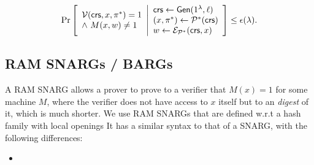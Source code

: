 \begin{definition} 
\begin{itemize}
\begin{gather*}
        \underset{}{\text{Pr}}\left [
        \begin{array}{ll}
        \mathcal{V}(\mathit{ \mathsf{crs} }, x, \pi^*) = 1 \\
        \wedge\ M(x,w)\neq 1
        \end{array}
        \middle\vert
        \begin{array}{ll}
        \mathit{ \mathsf{crs} } \leftarrow \mathsf{Gen}(1^\lambda, \ell) \\
        (x, \pi^*) \leftarrow \mathcal{P}^*(\mathit{ \mathsf{crs} }) \\
        w\leftarrow \mathcal{E}_{\mathcal{P}^*}(\mathit{ \mathsf{crs} }, x)
        \end{array}
        \right ] \leq \epsilon(\lambda)
	.
    \end{gather*}
\end{itemize}
\end{definition}


\subsection{RAM SNARGs / BARGs}
A RAM SNARG allows a  prover to prove to a verifier that $M(x) = 1$ for some machine $M$, where the verifier does not have access to $x$ itself but to an \emph{digest} of it, which is much shorter. We use RAM SNARGs that are defined w.r.t a hash family with local openings
It has a similar syntax to that of a SNARG, with the following differences:
\begin{itemize}
    \item 
\end{itemize}